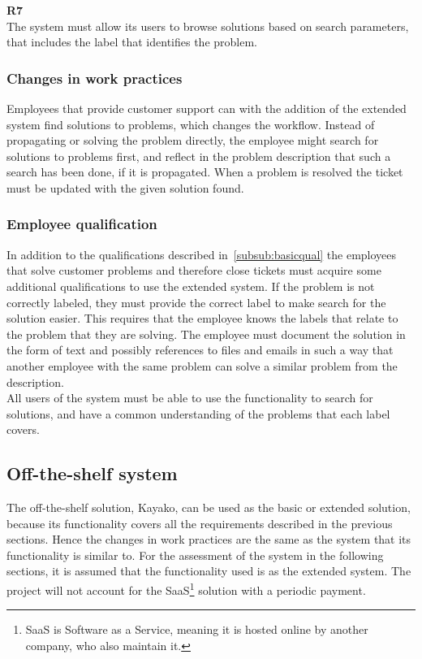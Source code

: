 \textbf{R7} \\
The system must allow its users to browse solutions based on search parameters, that includes the label that identifies the problem.

\subsubsection{Changes in work practices}
Employees that provide customer support can with the addition of the extended system find solutions to problems, which changes the workflow. Instead of propagating or solving the problem directly, the employee might search for solutions to problems first, and reflect in the problem description that such a search has been done, if it is propagated. When a problem is resolved the ticket must be updated with the given solution found.

\subsubsection{Employee qualification}
\label{subsec:qualification}
In addition to the qualifications described in~\ref{subsub:basicqual} the employees that solve customer problems and therefore close tickets must acquire some additional qualifications to use the extended system.
If the problem is not correctly labeled, they must provide the correct label to make search for the solution easier. This requires that the employee knows the labels that relate to the problem that they are solving. The employee must document the solution in the form of text and possibly references to files and emails in such a way that another employee with the same problem can solve a similar problem from the description.\\
All users of the system must be able to use the functionality to search for solutions, and have a common understanding of the problems that each label covers.

\subsection{Off-the-shelf system}
The off-the-shelf solution, Kayako\cite{webpage005}, can be used as the basic or extended solution, because its functionality covers all the requirements described in the previous sections. Hence the changes in work practices are the same as the system that its functionality is similar to. For the assessment of the system in the following sections, it is assumed that the functionality used is as the extended system.
The project will not account for the SaaS\footnote{SaaS is Software as a Service, meaning it is hosted online by another company, who also maintain it.} solution with a periodic payment.\\

